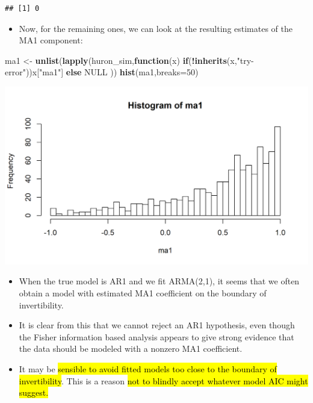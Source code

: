 \documentclass[]{article}
\newenvironment{Shaded}{\begin{snugshade}}{\end{snugshade}}
\newcommand{\KeywordTok}[1]{\textcolor[rgb]{0.13,0.29,0.53}{\textbf{#1}}}
\newcommand{\DataTypeTok}[1]{\textcolor[rgb]{0.13,0.29,0.53}{#1}}
\newcommand{\DecValTok}[1]{\textcolor[rgb]{0.00,0.00,0.81}{#1}}
\newcommand{\StringTok}[1]{\textcolor[rgb]{0.31,0.60,0.02}{#1}}
\newcommand{\OtherTok}[1]{\textcolor[rgb]{0.56,0.35,0.01}{#1}}
\newcommand{\ControlFlowTok}[1]{\textcolor[rgb]{0.13,0.29,0.53}{\textbf{#1}}}
\newcommand{\OperatorTok}[1]{\textcolor[rgb]{0.81,0.36,0.00}{\textbf{#1}}}
\newcommand{\NormalTok}[1]{#1}
\providecommand{\tightlist}{%
  \setlength{\itemsep}{0pt}\setlength{\parskip}{0pt}}
\begin{document}
\begin{verbatim}
## [1] 0
\end{verbatim}

\begin{itemize}
\tightlist
\item
  Now, for the remaining ones, we can look at the resulting estimates of
  the MA1 component:
\end{itemize}

\begin{Shaded}
\begin{Highlighting}[]
\NormalTok{ma1 <-}\StringTok{ }\KeywordTok{unlist}\NormalTok{(}\KeywordTok{lapply}\NormalTok{(huron_sim,}\ControlFlowTok{function}\NormalTok{(x) }\ControlFlowTok{if}\NormalTok{(}\OperatorTok{!}\KeywordTok{inherits}\NormalTok{(x,}\StringTok{"try-error"}\NormalTok{))x[}\StringTok{"ma1"}\NormalTok{] }\ControlFlowTok{else} \OtherTok{NULL}\NormalTok{ ))}
\KeywordTok{hist}\NormalTok{(ma1,}\DataTypeTok{breaks=}\DecValTok{50}\NormalTok{)  }
\end{Highlighting}
\end{Shaded}

\begin{center}\includegraphics{figure/intro-histB-1} \end{center}

\begin{itemize}
\item
  When the true model is AR1 and we fit ARMA(2,1), it seems that we
  often obtain a model with estimated MA1 coefficient on the boundary of
  invertibility.
\item
  It is clear from this that we cannot reject an AR1 hypothesis, even
  though the Fisher information based analysis appears to give strong
  evidence that the data should be modeled with a nonzero MA1
  coefficient.
\item
  It may be \hl{sensible to avoid fitted models too close to the boundary of
  invertibility}. This is a reason \hl{not to blindly accept whatever model
  AIC might suggest.}
\end{itemize}
\end{document}
